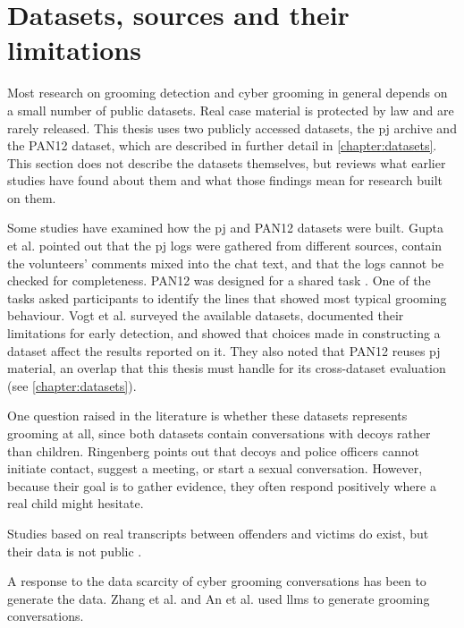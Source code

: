 \section{Datasets, sources and their limitations}
\label{literature-study:cyber-grooming-datasets}
Most research on grooming detection and cyber grooming in general depends on a small number of public datasets. Real case material is protected by law and are rarely released. This thesis uses two publicly accessed datasets, the \gls{pj} archive and the PAN12 dataset, which are described in further detail in \autoref{chapter:datasets}. This section does not describe the datasets themselves, but reviews what earlier studies have found about them and what those findings mean for research built on them.

Some studies have examined how the \gls{pj} and PAN12 datasets were built. Gupta et al. \cite{gupta2012} pointed out that the \gls{pj} logs were gathered from different sources, contain the volunteers' comments mixed into the chat text, and that the logs cannot be checked for completeness. PAN12 was designed for a shared task \cite{inches2012}. One of the tasks asked participants to identify the lines that showed most typical grooming behaviour. Vogt et al. \cite{vogt2021} surveyed the available datasets, documented their limitations for early detection, and showed that choices made in constructing a dataset affect the results reported on it. They also noted that PAN12 reuses \gls{pj} material, an overlap that this thesis must handle for its cross-dataset evaluation (see \autoref{chapter:datasets}).

One question raised in the literature is whether these datasets represents grooming at all, since both datasets contain conversations with decoys rather than children. Ringenberg \cite{ringenberg2021} points out that decoys and police officers cannot initiate contact, suggest a meeting, or start a sexual conversation. However, because their goal is to gather evidence, they often respond positively where a real child might hesitate. 

Studies based on real transcripts between offenders and victims do exist, but their data is not public \cite{kloess2017, kloess2019}. 

A response to the data scarcity of cyber grooming conversations has been to generate the data. Zhang et al. \cite{xhang2024} and An et al. \cite{an2026} used \gls{llm}s to generate grooming conversations. %

